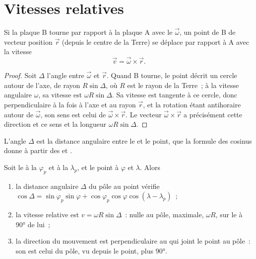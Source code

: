 \section{Vitesses relatives}

\begin{theorem}\label{thm:b1:plate-kinematics:velocity}
Si la plaque B tourne par rapport à la plaque A avec le  $\vec\omega$, un point
de B de vecteur position $\vec r$ (depuis le centre de la Terre) se déplace
par rapport à A avec la vitesse
\[
  \vec v = \vec\omega\times\vec r .
\]
\end{theorem}

\begin{proof}
Soit $\Delta$ l'angle entre $\vec\omega$ et $\vec r$. Quand B tourne, le
point décrit un cercle autour de l'axe, de rayon $R\sin\Delta$, où $R$ est
le rayon de la Terre~; à la vitesse angulaire $\omega$, sa vitesse est
$\omega R\sin\Delta$. Sa vitesse est tangente à ce cercle, donc perpendiculaire
à la fois à l'axe et au rayon $\vec r$, et la rotation étant
antihoraire autour de $\vec\omega$, son sens est celui de $\vec\omega\times\vec r$.
Le vecteur $\vec\omega\times\vec r$ a précisément cette direction et ce sens et
la longueur $\omega R\sin\Delta$.
\end{proof}

L'angle $\Delta$ est la distance angulaire entre le  et le point,
que la formule des cosinus donne à partir des  et .

\begin{proposition}\label{prop:b1:plate-kinematics:speed}
Soit le  à la  $\varphi_p$ et à la  $\lambda_p$, et le
point à $\varphi$ et $\lambda$. Alors
\begin{enumerate}
  \item la distance angulaire $\Delta$ du pôle au point vérifie
        $\cos\Delta = \sin\varphi_p\sin\varphi + \cos\varphi_p\cos\varphi
        \cos(\lambda - \lambda_p)$~;
  \item la vitesse relative est $v = \omega R\sin\Delta$~: nulle au pôle,
        maximale, $\omega R$, sur le  à \ang{90} de lui~;
  \item la direction du mouvement est perpendiculaire au  qui joint
        le point au pôle~: son  est celui du pôle, vu depuis
        le point, plus \ang{90}.
\end{enumerate}
\end{proposition}

